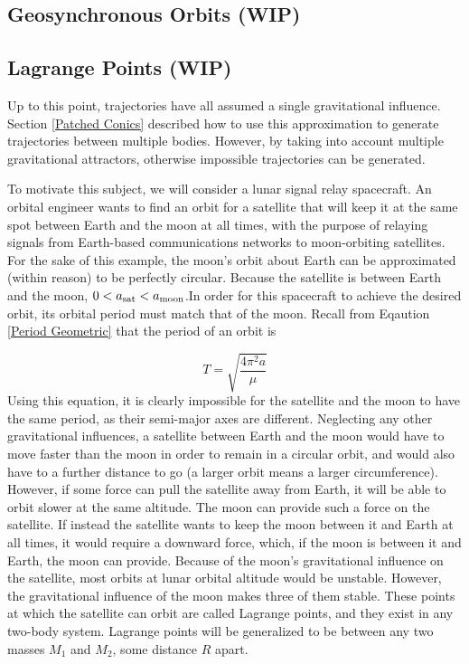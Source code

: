 \documentclass[../basicOrbitalDynamics.tex]{subfiles}
\begin{document}

\bigskip\bigskip
\subsection{Geosynchronous Orbits (WIP)}\label{Geosynchronous Orbits}


\bigskip\bigskip
\subsection{Lagrange Points (WIP)}\label{Lagrange Points}

Up to this point, trajectories have all assumed a single gravitational influence. Section \ref{Patched Conics} described how to use this approximation to generate trajectories between multiple bodies. However, by taking into account multiple gravitational attractors, otherwise impossible trajectories can be generated.

To motivate this subject, we will consider a lunar signal relay spacecraft. An orbital engineer wants to find an orbit for a satellite that will keep it at the same spot between Earth and the moon at all times, with the purpose of relaying signals from Earth-based communications networks to moon-orbiting satellites. For the sake of this example, the moon's orbit about Earth can be approximated (within reason) to be perfectly circular. Because the satellite is between Earth and the moon, $0<{a}_\text{sat}<{a}_\text{moon}$.In order for this spacecraft to achieve the desired orbit, its orbital period must match that of the moon. Recall from Eqaution \eqref{Period Geometric} that the period of an orbit is

$$T=\sqrt{\frac{4\pi^2 a}{\mu}}$$
Using this equation, it is clearly impossible for the satellite and the moon to have the same period, as their semi-major axes are different. Neglecting any other gravitational influences, a satellite between Earth and the moon would have to move faster than the moon in order to remain in a circular orbit, and would also have to a further distance to go (a larger orbit means a larger circumference). However, if some force can pull the satellite away from Earth, it will be able to orbit slower at the same altitude. The moon can provide such a force on the satellite. If instead the satellite wants to keep the moon between it and Earth at all times, it would require a downward force, which, if the moon is between it and Earth, the moon can provide. Because of the moon's gravitational influence on the satellite, most orbits at lunar orbital altitude would be unstable. However, the gravitational influence of the moon makes three of them stable. These points at which the satellite can orbit are called Lagrange points, and they exist in any two-body system. Lagrange points will be generalized to be between any two masses $M_1$ and $M_2$, some distance $R$ apart.
\end{document}
